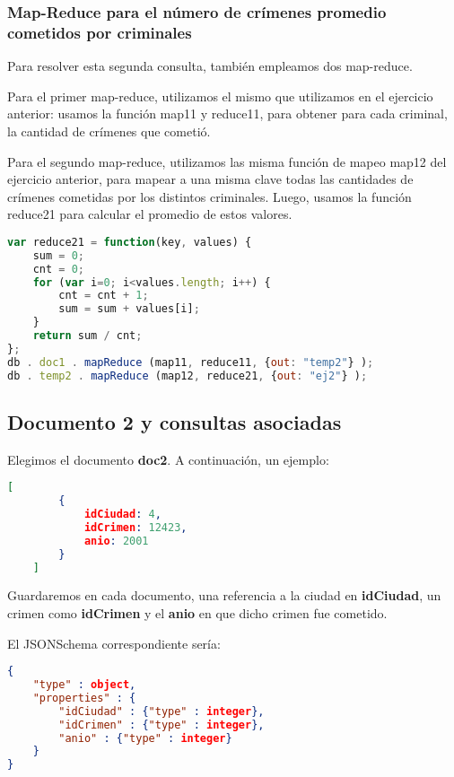 \documentclass[11pt, a4paper]{article}
\begin{document}
\subsubsection{Map-Reduce para el número de crímenes promedio cometidos por criminales}

Para resolver esta segunda consulta, también empleamos dos map-reduce. 

Para el primer map-reduce, utilizamos el mismo que utilizamos en el ejercicio anterior: usamos la función map11 y reduce11, para obtener para cada criminal, la cantidad de crímenes que cometió. 

Para el segundo map-reduce, utilizamos las misma función de mapeo map12 del ejercicio anterior, para mapear a una misma clave todas las cantidades de crímenes cometidas por los distintos criminales. Luego, usamos la función reduce21 para calcular el promedio de estos valores.

\begin{lstlisting}[language=JavaScript]
var reduce21 = function(key, values) {
    sum = 0;
    cnt = 0;
    for (var i=0; i<values.length; i++) {
        cnt = cnt + 1;
        sum = sum + values[i];
    }
    return sum / cnt;
};
db . doc1 . mapReduce (map11, reduce11, {out: "temp2"} );
db . temp2 . mapReduce (map12, reduce21, {out: "ej2"} );
\end{lstlisting}


\subsection{Documento 2 y consultas asociadas}

Elegimos el documento \textbf{doc2}. A continuación, un ejemplo:\

\begin{lstlisting}[language=json]
	[
		{
			idCiudad: 4,
			idCrimen: 12423,
			anio: 2001
		}
	]
\end{lstlisting}

Guardaremos en cada documento,  una referencia a la ciudad en \textbf{idCiudad}, un crimen como \textbf{idCrimen} y el \textbf{anio} en que dicho crimen fue cometido. \

El JSONSchema correspondiente sería:
\begin{lstlisting}[language=json]
{
	"type" : object,
	"properties" : {
		"idCiudad" : {"type" : integer},
		"idCrimen" : {"type" : integer},
		"anio" : {"type" : integer}
	}
}
\end{lstlisting}
\end{document}
